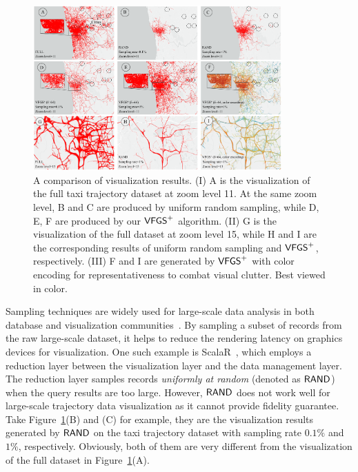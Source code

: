 \begin{figure}[t]
	\centering
	\includegraphics[width=0.85\textwidth]{pictures/Teaser.pdf}
	\vspace{-3mm}
	\caption{A comparison of visualization results. (I) A is the visualization of the full \pt{} taxi trajectory dataset at zoom level 11.
    At the same zoom level, B and C are produced by uniform random sampling,
    while D, E, F are produced by our $\mathsf{VFGS}^{+}$ algorithm.
    (II) G is the visualization of the full \pt{} dataset at zoom level 15, while H and I are the corresponding results of uniform random sampling and $\mathsf{VFGS}^{+}$, respectively.
    (III) F and I are generated by $\mathsf{VFGS}^{+}$ with color encoding for representativeness to combat visual clutter.
    Best viewed in color.}
	\label{fig:teaser}
\trim
\end{figure}

Sampling techniques are widely used for large-scale data analysis in both database and visualization communities~\cite{qin2020making,DBLP:conf/sigmod/DingHCC016,DBLP:journals/pvldb/KimBPIMR15,park2016visualization}. By sampling a subset of records from the raw large-scale dataset, it helps to reduce the rendering latency on graphics devices for visualization. One such example is ScalaR~\cite{battle2013dynamic}, which employs a reduction layer between the visualization layer and the data management layer. The reduction layer samples records \textit{uniformly at random} (denoted as $\mathsf{RAND}$) when the query results are too large. However, $\mathsf{RAND}$ does not work well for large-scale trajectory data visualization as it cannot provide fidelity guarantee. Take Figure~\ref{fig:teaser}(B) and (C) for example, they are the visualization results generated by $\mathsf{RAND}$ on the \pt{} taxi trajectory dataset with sampling rate $0.1\%$ and $1\%$, respectively. Obviously, both of them are very different from the visualization of the full \pt{} dataset in Figure~\ref{fig:teaser}(A).


